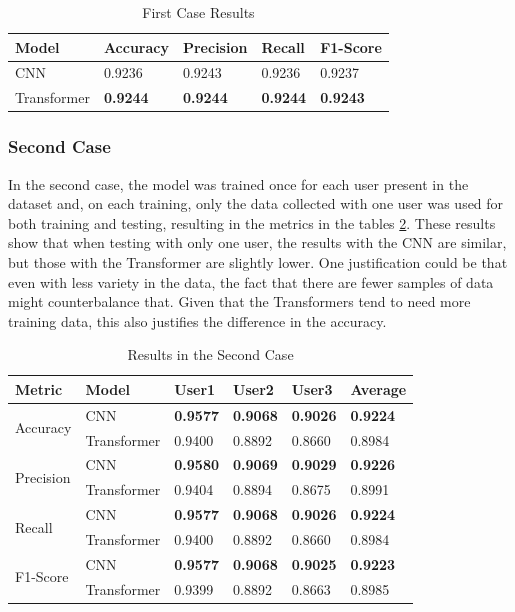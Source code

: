 \begin{table}[H]
    \centering
    \caption{First Case Results}
    \label{table:results_first_case}
    \begin{tabular}{|l|l|l|l|l|}
        \hline
        Model & Accuracy & Precision & Recall & F1-Score \\
        \hline
        CNN & 0.9236 & 0.9243 & 0.9236 & 0.9237 \\
        \hline
        Transformer & \textbf{0.9244} & \textbf{0.9244} & \textbf{0.9244} & \textbf{0.9243} \\
        \hline
    \end{tabular}
\end{table}

\subsubsection{Second Case}

In the second case, the model was trained once for each user present in the dataset and, on each training, only the data collected with one user was used for both training and testing, resulting in the metrics in the tables \ref{table:results_second_case}. These results show that when testing with only one user, the results with the CNN are similar, but those with the Transformer are slightly lower. One justification could be that even with less variety in the data, the fact that there are fewer samples of data might counterbalance that. Given that the Transformers tend to need more training data, this also justifies the difference in the accuracy.

\begin{table}[H]
    \centering
    \caption{Results in the Second Case}
    \label{table:results_second_case}
    \begin{tabular}{|l|l|l|l|l|l|}
        \hline
        Metric & Model & User1 & User2 & User3 & Average \\
        \hline \hline
        \multirow{2}{*}{Accuracy} & CNN & \textbf{0.9577} & \textbf{0.9068} & \textbf{0.9026} & \textbf{0.9224} \\
        \cline{2-6}
        & Transformer & 0.9400 & 0.8892 &  0.8660 & 0.8984 \\
        \hline \hline
        \multirow{2}{*}{Precision} & CNN & \textbf{0.9580} & \textbf{0.9069} & \textbf{0.9029} & \textbf{0.9226} \\
        \cline{2-6}
        & Transformer & 0.9404 & 0.8894 & 0.8675 & 0.8991 \\
        \hline \hline
        \multirow{2}{*}{Recall} & CNN & \textbf{0.9577} & \textbf{0.9068} & \textbf{0.9026} & \textbf{0.9224} \\
        \cline{2-6}
        & Transformer & 0.9400 & 0.8892 & 0.8660 & 0.8984 \\
        \hline \hline
        \multirow{2}{*}{F1-Score} & CNN & \textbf{0.9577} & \textbf{0.9068} & \textbf{0.9025} & \textbf{0.9223} \\
        \cline{2-6}
        & Transformer & 0.9399 & 0.8892 & 0.8663 & 0.8985 \\
        \hline
    \end{tabular}
\end{table}

